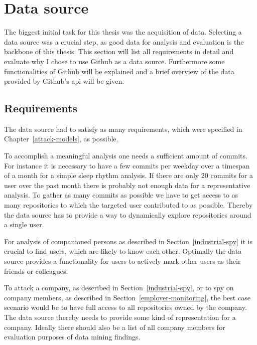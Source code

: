 \section{Data source}\label{data-source}
The biggest initial task for this thesis was the acquisition of data.
Selecting a data source was a crucial step, as good data for analysis and evaluation is the backbone of this thesis.
This section will list all requirements in detail and evaluate why I chose to use Github as a data source.
Furthermore some functionalities of Github will be explained and a brief overview of the data provided by Github's \ac{api} will be given.


\subsection{Requirements}\label{requirements}
The data source had to satisfy as many requirements, which were specified in Chapter~\ref{attack-models}, as possible.

To accomplish a meaningful analysis one needs a sufficient amount of commits.
For instance it is necessary to have a few commits per weekday over a timespan of a month for a simple sleep rhythm analysis.
If there are only 20 commits for a user over the past month there is probably not enough data for a representative analysis.
To gather as many commits as possible we have to get access to as many repositories to which the targeted user contributed to as possible.
Thereby the data source has to provide a way to dynamically explore repositories around a single user.

For analysis of companioned persons as described in Section~\ref{industrial-spy} it is crucial to find users, which are likely to know each other.
Optimally the data source provides a functionality for users to actively mark other users as their friends or colleagues.

To attack a company, as described in Section~\ref{industrial-spy}, or to spy on company members, as described in Section~\ref{employer-monitoring}, the best case scenario would be to have full access to all repositories owned by the company.
The data source thereby needs to provide some kind of representation for a company.
Ideally there should also be a list of all company members for evaluation purposes of data mining findings.


